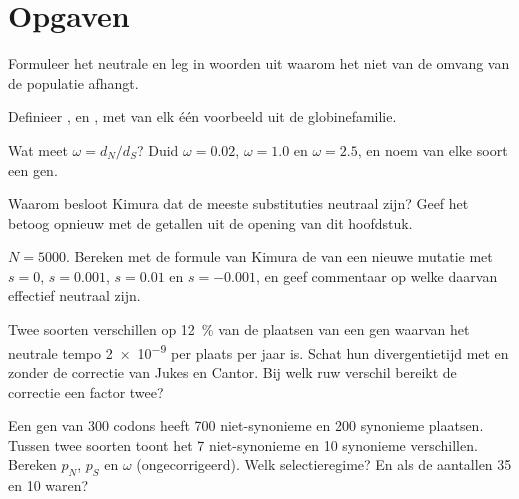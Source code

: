 \section{Opgaven}

\begin{exercise}[$\star$]\label{exo:b3:molecular-evolution:1}
Formuleer het neutrale  en leg in woorden uit waarom
het niet van de omvang van de populatie afhangt.
\end{exercise}

\begin{exercise}[$\star$]\label{exo:b3:molecular-evolution:2}
Definieer ,  en , met van elk één voorbeeld
uit de globinefamilie.
\end{exercise}

\begin{exercise}[$\star$]\label{exo:b3:molecular-evolution:3}
Wat meet $\omega = d_{N}/d_{S}$? Duid $\omega = 0.02$, $\omega = 1.0$
en $\omega = 2.5$, en noem van elke soort een gen.
\end{exercise}

\begin{exercise}[$\star$]\label{exo:b3:molecular-evolution:4}
Waarom besloot Kimura dat de meeste substituties neutraal zijn? Geef
het betoog opnieuw met de getallen uit de opening van dit hoofdstuk.
\end{exercise}

\begin{exercise}[$\star\star$]\label{exo:b3:molecular-evolution:5}
$N = 5000$. Bereken met de formule van Kimura de  van een
nieuwe mutatie met $s
= 0$, $s = 0.001$, $s = 0.01$ en $s = -0.001$, en geef commentaar op
welke daarvan effectief neutraal zijn.
\end{exercise}

\begin{exercise}[$\star\star$]\label{exo:b3:molecular-evolution:6}
Twee soorten verschillen op \qty{12}{\%} van de plaatsen van een gen
waarvan het neutrale tempo \qty{2e-9}{} per plaats per jaar is. Schat
hun divergentietijd met en zonder de correctie van Jukes en Cantor. Bij
welk ruw verschil bereikt de correctie een factor twee?
\end{exercise}

\begin{exercise}[$\star\star$]\label{exo:b3:molecular-evolution:7}
Een gen van 300 codons heeft 700 niet-synonieme en 200 synonieme
plaatsen. Tussen twee soorten toont het 7 niet-synonieme en 10
synonieme verschillen. Bereken $p_{N}$, $p_{S}$ en $\omega$
(ongecorrigeerd). Welk selectieregime? En als de aantallen 35 en 10
waren?
\end{exercise}

